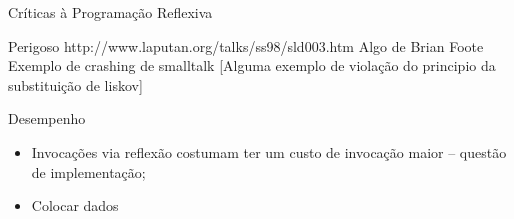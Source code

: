 \documentclass[12pt,t]{beamer}
\begin{document}
 	 \begin{frame}{Críticas à Programação Reflexiva}
 	 	\begin{block}{Perigoso}
 	 		http://www.laputan.org/talks/ss98/sld003.htm
 	 		\alert{Algo de Brian Foote}
 	 		\alert{Exemplo de crashing de smalltalk}
 	 		\alert{[Alguma exemplo de violação do principio da substituição de liskov]}
 	 	\end{block}
 	 	\begin{block}{Desempenho}
 	 		\begin{itemize}
 	 			\item Invocações via reflexão costumam ter um custo de invocação maior -- \alert{questão de implementação};
 	 			\item \alert{Colocar dados}
 	 		\end{itemize}
 	 	\end{block}
 	 \end{frame}
\end{document}
